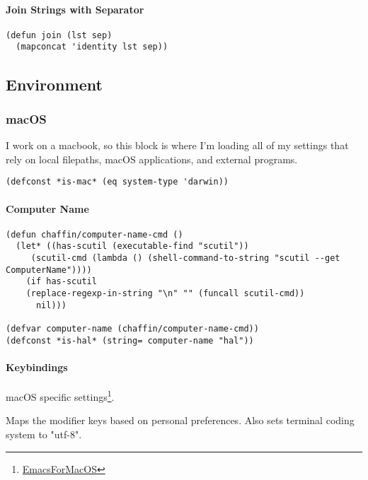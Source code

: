 \documentclass[11pt]{article}
\begin{document}
\paragraph*{Join Strings with Separator}
\label{sec:org22d6c9b}

\begin{verbatim}
(defun join (lst sep)
  (mapconcat 'identity lst sep))
\end{verbatim}

\subsection*{Environment}
\label{sec:org0dfe034}
\subsubsection*{macOS}
\label{sec:org56c1a44}

I work on a macbook, so this block is where I'm loading all of my settings that rely on local
filepaths, macOS applications, and external programs.

\begin{verbatim}
(defconst *is-mac* (eq system-type 'darwin))
\end{verbatim}

\paragraph*{Computer Name}
\label{sec:orgd86864a}

\begin{verbatim}
(defun chaffin/computer-name-cmd ()
  (let* ((has-scutil (executable-find "scutil"))
	 (scutil-cmd (lambda () (shell-command-to-string "scutil --get ComputerName"))))
    (if has-scutil
	(replace-regexp-in-string "\n" "" (funcall scutil-cmd))
      nil)))

(defvar computer-name (chaffin/computer-name-cmd))
(defconst *is-hal* (string= computer-name "hal"))
\end{verbatim}

\paragraph*{Keybindings}
\label{sec:org03476d5}
macOS specific settings\footnote{\href{https://www.emacswiki.org/emacs/EmacsForMacOS}{EmacsForMacOS}}.

Maps the modifier keys based on personal preferences.
Also sets terminal coding system to "utf-8".
\end{document}
